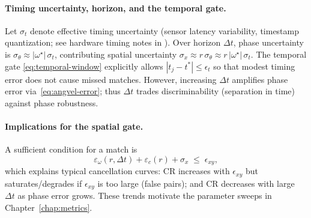 \paragraph{Timing uncertainty, horizon, and the temporal gate.}
Let $\sigma_t$ denote effective timing uncertainty (sensor latency variability, timestamp quantization; see hardware timing notes in \cite{Lichtsteiner2008,Delbruck2014ISCAS}). Over horizon $\Delta t$, phase uncertainty is $\sigma_\theta \approx |\omega^\star|\,\sigma_t$, contributing spatial uncertainty $\sigma_x \approx r\,\sigma_\theta \approx r\,|\omega^\star|\,\sigma_t$. The temporal gate \eqref{eq:temporal-window} explicitly allows $|t_j-t^*|\le \epsilon_t$ so that modest timing error does not cause missed matches. However, increasing $\Delta t$ amplifies phase error via~\eqref{eq:angvel-error}; thus $\Delta t$ trades discriminability (separation in time) against phase robustness.

\paragraph{Implications for the spatial gate.}
A sufficient condition for a match is
\begin{equation}
\varepsilon_{\omega}(r,\Delta t) + \varepsilon_c(r) + \sigma_x \;\le\; \epsilon_{xy},
\label{eq:gate-condition}
\end{equation}
which explains typical cancellation curves: $\mathrm{CR}$ increases with $\epsilon_{xy}$ but saturates/degrades if $\epsilon_{xy}$ is too large (false pairs); and $\mathrm{CR}$ decreases with large $\Delta t$ as phase error grows. These trends motivate the parameter sweeps in Chapter~\ref{chap:metrics}.

